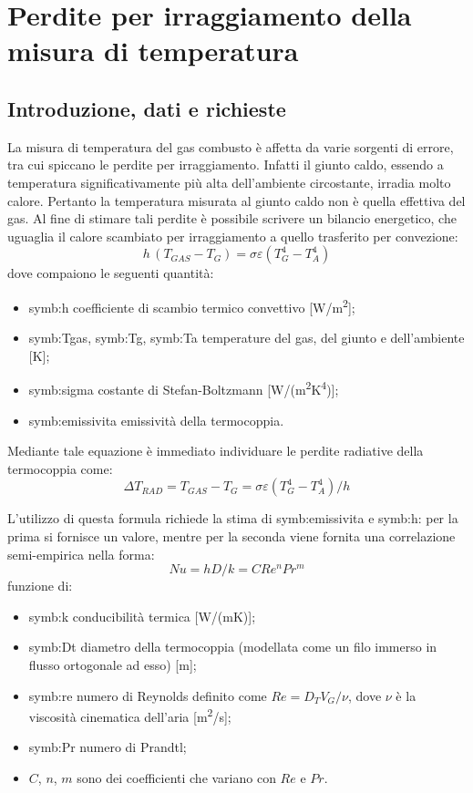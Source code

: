 \section{Perdite per irraggiamento della misura di temperatura}
\subsection{Introduzione, dati e richieste}
La misura di temperatura del gas combusto è affetta da varie sorgenti di errore, tra cui spiccano le perdite per irraggiamento. 
Infatti il giunto caldo, essendo a temperatura significativamente più alta dell'ambiente circostante, irradia molto calore. Pertanto la temperatura misurata al giunto caldo non è quella effettiva del gas. 
Al fine di stimare tali perdite è possibile scrivere un bilancio energetico, che uguaglia il calore scambiato per irraggiamento a quello trasferito per convezione: 
\begin{equation}
	h \,(T_{\textit{GAS}}-T_G) = \sigma \varepsilon (T_G^4-T_A^4)
\end{equation}
dove compaiono le seguenti quantità:
\begin{itemize}
	\item \gls{symb:h} coefficiente di scambio termico convettivo [W/m\textsuperscript{2}];
	\item \gls{symb:Tgas}, \gls{symb:Tg}, \gls{symb:Ta} temperature del gas, del giunto e dell'ambiente [K];
	\item \gls{symb:sigma} costante di Stefan-Boltzmann [W/(m\textsuperscript{2}K\textsuperscript{4})];
	\item \gls{symb:emissivita} emissività della termocoppia.
\end{itemize}

Mediante tale equazione è immediato individuare le perdite radiative della termocoppia come:
\begin{equation}
	\Delta T_{\textit{RAD}} = T_{\textit{GAS}} -T_G = \sigma \varepsilon (T_G^4-T_A^4) / h
\end{equation}

L'utilizzo di questa formula richiede la stima di \gls{symb:emissivita} e \gls{symb:h}: per la prima si fornisce un valore, mentre per la seconda viene fornita una correlazione semi-empirica nella forma:
\begin{equation}
	Nu = hD/k = CRe^nPr^m
\end{equation}
funzione di:
\begin{itemize}
	\item \gls{symb:k} conducibilità termica [W/(mK)];
	\item \gls{symb:Dt} diametro della termocoppia (modellata come un filo immerso in flusso ortogonale ad esso) [m];
	\item \gls{symb:re} numero di Reynolds definito come $Re = D_T V_G/\nu$, dove $\nu$ è la viscosità cinematica dell'aria [m\textsuperscript{2}/s];
	\item \gls{symb:Pr} numero di Prandtl;
	\item $C$, $n$, $m$ sono dei coefficienti che variano con $Re$ e $Pr$.
\end{itemize}

